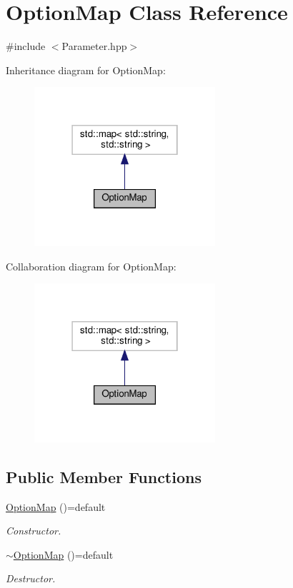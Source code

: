\hypertarget{classOptionMap}{}\section{Option\+Map Class Reference}
\label{classOptionMap}


{\ttfamily \#include $<$Parameter.\+hpp$>$}



Inheritance diagram for Option\+Map\+:
\nopagebreak
\begin{figure}[H]
\begin{center}
\leavevmode
\includegraphics[width=190pt]{d1/d3e/classOptionMap__inherit__graph}
\end{center}
\end{figure}


Collaboration diagram for Option\+Map\+:
\nopagebreak
\begin{figure}[H]
\begin{center}
\leavevmode
\includegraphics[width=190pt]{d9/d08/classOptionMap__coll__graph}
\end{center}
\end{figure}
\subsection*{Public Member Functions}
\begin{DoxyCompactItemize}
\item 
\hyperlink{classOptionMap_a700c0a7252b0d0134acdc5b41b388ffe}{Option\+Map} ()=default
\begin{DoxyCompactList}\small\item\em Constructor. \end{DoxyCompactList}\item 
\hyperlink{classOptionMap_a48c7b4fba7d94f9c06d4b14ca0667a30}{$\sim$\+Option\+Map} ()=default
\begin{DoxyCompactList}\small\item\em Destructor. \end{DoxyCompactList}\end{DoxyCompactItemize}


